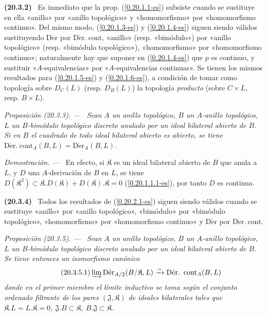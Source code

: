 \documentclass[10pt,oneside]{book}
\makeatletter
\newcommand{\sref}[1]{\textup{(\ref{#1})}}
\newcommand{\setmanualcurrentlabel}[1]{\def\@currentlabel{#1}}
\newenvironment{env}[1][]{\setmanualcurrentlabel{#1}\par\medskip\noindent\textbf{(#1)}\ }{\par}
\newenvironment{proposition}[1][]{%
  \setmanualcurrentlabel{#1}\par\medskip\noindent\itshape Proposición (#1). ---\ }{\par}
\newenvironment{proof}{%
  \par\medskip\noindent\textit{Demostración. ---\ }}{\par}
\makeatother
\begin{document}
\begin{env}[20.3.2]
\label{0.20.3.2-es}
Es inmediato que la prop. \sref{0.20.1.1-es} subsiste cuando se sustituye en ella
«anillo» por «anillo topológico» y «homomorfismo» por
«homomorfismo continuo». Del mismo modo, \sref{0.20.1.3-es} y
\sref{0.20.1.4-es} siguen siendo válidos sustituyendo $\operatorname{D\acute{e}r}$ por
$\operatorname{D\acute{e}r.\ cont}$, «anillo» (resp. «bimódulo») por «anillo
topológico» (resp. «bimódulo topológico»), «homomorfismo» por
«homomorfismo continuo»; naturalmente hay que suponer en
\sref{0.20.1.4-es} que $p$ es continuo, y sustituir «$A$-equivalencias» por
«$A$-equivalencias continuas». Se tienen los mismos resultados para
\sref{0.20.1.5-es} y \sref{0.20.1.6-es}, a condición de tomar como
topología sobre $D_C(L)$ (resp. $D_B(L)$) la topología \emph{producto} (sobre
$C\times L$, resp. $B\times L$).
\end{env}

\begin{proposition}[20.3.3]
\label{0.20.3.3-es}
Sean $A$ un anillo topológico, $B$ un $A$-anillo topológico, $L$ un
$B$-bimódulo topológico discreto anulado por un ideal bilateral abierto de $B$.
Si en $B$ el cuadrado de todo ideal bilateral abierto es abierto, se tiene
$\operatorname{D\acute{e}r.\ cont}_A(B,L)=\operatorname{D\acute{e}r}_A(B,L)$.
\end{proposition}

\begin{proof}
En efecto, si $\mathfrak K$ es un ideal bilateral abierto de $B$ que anula a $L$,
y $D$ una $A$-derivación de $B$ en $L$, se tiene
$D(\mathfrak K^2)\subset\mathfrak K.D(\mathfrak K)+
D(\mathfrak K).\mathfrak K=0$ \sref{0.20.1.1.1-es}, por tanto $D$ es continua.
\end{proof}

\begin{env}[20.3.4]
\label{0.20.3.4-es}
Todos los resultados de \sref{0.20.2.1-es} siguen siendo válidos cuando se sustituye
«anillo» por «anillo topológico», «bimódulo» por «bimódulo
topológico», «homomorfismo» por «homomorfismo continuo» y
$\operatorname{D\acute{e}r}$ por $\operatorname{D\acute{e}r.\ cont}$.
\end{env}

\begin{proposition}[20.3.5]
\label{0.20.3.5-es}
Sean $A$ un anillo topológico, $B$ un $A$-anillo topológico, $L$ un
$B$-bimódulo topológico discreto anulado por un ideal bilateral abierto de $B$.
Se tiene entonces un isomorfismo canónico
\begin{equation}
\tag{20.3.5.1}
\label{0.20.3.5.1-es}
  \varinjlim\operatorname{D\acute{e}r}_{A/\mathfrak{J}}
  (B/\mathfrak K,L)\xrightarrow{\sim}
  \operatorname{D\acute{e}r.\ cont}_A(B,L)
\end{equation}
donde en el primer miembro el límite inductivo se toma según el conjunto
ordenado filtrante de los pares $(\mathfrak{J},\mathfrak K)$ de ideales bilaterales
tales que $\mathfrak K.L=L.\mathfrak K=0$,
$\mathfrak{J}.B\subset\mathfrak K$,
$B.\mathfrak{J}\subset\mathfrak K$.
\end{proposition}
\end{document}
